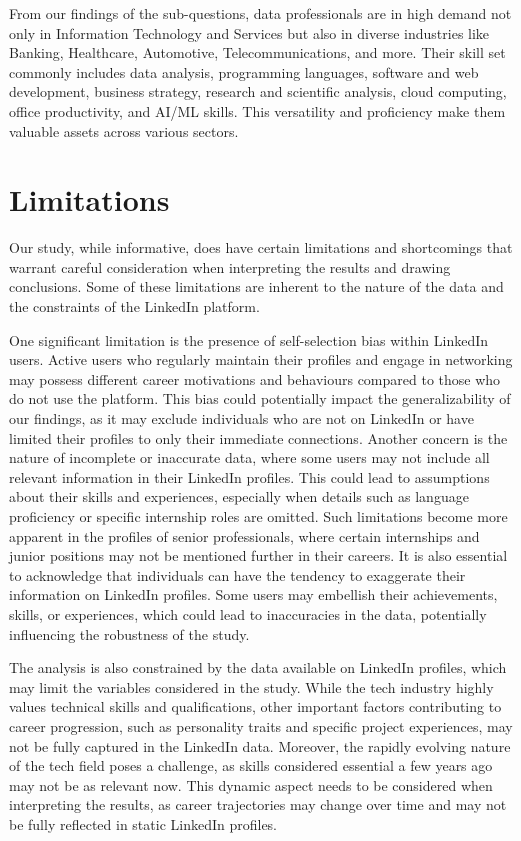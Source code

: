 \documentclass[11pt,]{article}
\begin{document}
From our findings of the sub-questions, data professionals are in high
demand not only in Information Technology and Services but also in
diverse industries like Banking, Healthcare, Automotive,
Telecommunications, and more. Their skill set commonly includes data
analysis, programming languages, software and web development, business
strategy, research and scientific analysis, cloud computing, office
productivity, and AI/ML skills. This versatility and proficiency make
them valuable assets across various sectors.

\hypertarget{limitations}{%
\section{Limitations}\label{limitations}}

Our study, while informative, does have certain limitations and
shortcomings that warrant careful consideration when interpreting the
results and drawing conclusions. Some of these limitations are inherent
to the nature of the data and the constraints of the LinkedIn platform.

One significant limitation is the presence of self-selection bias within
LinkedIn users. Active users who regularly maintain their profiles and
engage in networking may possess different career motivations and
behaviours compared to those who do not use the platform. This bias
could potentially impact the generalizability of our findings, as it may
exclude individuals who are not on LinkedIn or have limited their
profiles to only their immediate connections. Another concern is the
nature of incomplete or inaccurate data, where some users may not
include all relevant information in their LinkedIn profiles. This could
lead to assumptions about their skills and experiences, especially when
details such as language proficiency or specific internship roles are
omitted. Such limitations become more apparent in the profiles of senior
professionals, where certain internships and junior positions may not be
mentioned further in their careers. It is also essential to acknowledge
that individuals can have the tendency to exaggerate their information
on LinkedIn profiles. Some users may embellish their achievements,
skills, or experiences, which could lead to inaccuracies in the data,
potentially influencing the robustness of the study.

The analysis is also constrained by the data available on LinkedIn
profiles, which may limit the variables considered in the study. While
the tech industry highly values technical skills and qualifications,
other important factors contributing to career progression, such as
personality traits and specific project experiences, may not be fully
captured in the LinkedIn data. Moreover, the rapidly evolving nature of
the tech field poses a challenge, as skills considered essential a few
years ago may not be as relevant now. This dynamic aspect needs to be
considered when interpreting the results, as career trajectories may
change over time and may not be fully reflected in static LinkedIn
profiles.
\end{document}
